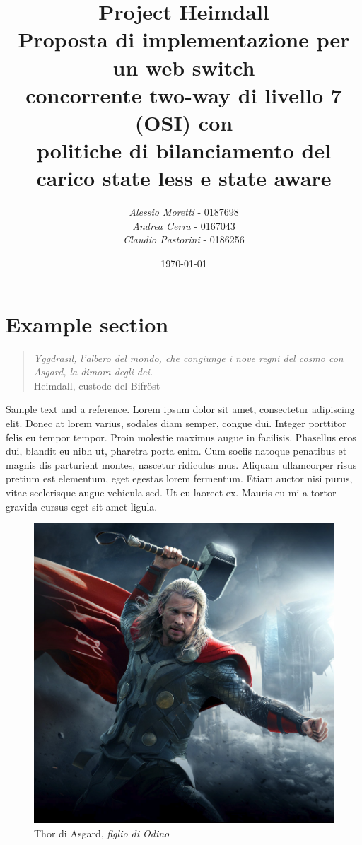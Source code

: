 \documentclass[italian]{tktltiki2}
\title{%
    \huge Project Heimdall
    \\
    \large Proposta di implementazione per un web switch
    \\
    concorrente two-way di livello 7 (OSI) con
    \\
    politiche di bilanciamento del carico state less e state aware
  }
\author{\emph{Alessio Moretti} - 0187698
    \\
    \emph{Andrea Cerra} - 0167043
    \\
    \emph{Claudio Pastorini} - 0186256}
\date{\today}
\begin{document}
\maketitle        %

\tableofcontents  %

\mainmatter       %

\section{Example section}
\begin{quote}
\flushright
	\emph{Yggdrasil, l'albero del mondo, che congiunge i nove regni del cosmo con Asgard, la dimora degli dei.}
  \\
  Heimdall, custode del Bifröst
\end{quote}

Sample text and a reference\cite{lamport94}. Lorem ipsum dolor sit amet, consectetur adipiscing elit. Donec at lorem varius, sodales diam semper, congue dui. Integer porttitor felis eu tempor tempor. Proin molestie maximus augue in facilisis. Phasellus eros dui, blandit eu nibh ut, pharetra porta enim. Cum sociis natoque penatibus et magnis dis parturient montes, nascetur ridiculus mus. Aliquam ullamcorper risus pretium est elementum, eget egestas lorem fermentum. Etiam auctor nisi purus, vitae scelerisque augue vehicula sed. Ut eu laoreet ex. Mauris eu mi a tortor gravida cursus eget sit amet ligula.

\begin{figure}
\centering
\includegraphics[width=\textwidth]{images/thor}
\caption{Thor di Asgard, \emph{figlio di Odino}}
\end{figure}
\end{document}
